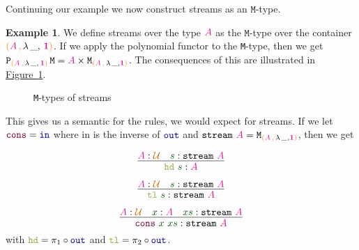 \documentclass[twoside,11pt,openright]{report}
\theoremstyle{plain} %
\theoremstyle{definition}
\newtheorem{exmp}{Example} %
\theoremstyle{remark}
\newcommand*{\figref}[1]{\hyperref[fig:#1]{Figure~\ref*{fig:#1}}}
\newcommand*{\term}[1]{\textcolor{green!30!black}{#1}} %
\newcommand*{\type}[1]{\textcolor{magenta!90!black}{#1}}
\newcommand*{\containerpair}[2]{\ensuremath{\colorlet{savedleftcolor}{.}\color{orange}\left(\color{savedleftcolor}#1\,\textcolor{orange}{\mathbf{,}}\,#2\color{orange}\right)\color{savedleftcolor}}}
\newcommand*{\containerpairsimple}[2]{\containerpair{#1}{\lambda\,\_,\,#2}}
\newcommand*{\universe}[1]{\textcolor{orange!80!black}{#1}}
\newcommand*{\unit}{\type{\textbf{1}}}
\newcommand*{\function}[1]{\textcolor{blue!60!black}{\ensuremath{\mathtt{#1}}}}
\newcommand*{\constructor}[1]{\textcolor{purple!60!black}{\ensuremath{\mathtt{#1}}}}
\newcommand*{\destructor}[1]{\textcolor{yellow!60!black}{\ensuremath{\mathtt{#1}}}}
\newcommand*{\typeformer}[1]{\ensuremath{\mathtt{#1}}}
\newcommand*{\functor}[1]{\ensuremath{\mathbf{\mathtt{#1}}}}
\begin{document}
\noindent Continuing our example we now construct streams as an \(\mathtt{M}\)-type.
\begin{exmp}
  \label{exmp:stream-M-type-example}
  We define streams over the type \(\type{A}\) as the \(\mathtt{M}\)-type over the container \(\containerpairsimple{\type{A}}{\unit}\). If we apply the polynomial functor to the \texttt{M}-type, then we get \(\functor{P}_{\containerpairsimple{\type{A}}{\unit}}\,\typeformer{M} = \type{A} \times \typeformer{M}_{\containerpair{\type{A}}{\lambda\,\_,\unit}}\). The consequences of this are illustrated in \figref{stream-M-type}.
  \begin{figure}[h]
    \centering
    \caption{\texttt{M}-types of streams}
    \label{fig:stream-M-type}
  \end{figure}
  This gives us a semantic for the rules, we would expect for streams. If we let \(\constructor{cons} = \function{in}\) where in is the inverse of \(\function{out}\) and \(\typeformer{stream}~\type{A} = \typeformer{M}_{\containerpair{\type{A}}{\lambda\,\_,\unit}}\), then we get
  \begin{center}
    \strut
    \hfill
    \begin{minipage}{0.4\linewidth}
      \begin{equation}
        \vcenter{\infer{\destructor{hd}~\term{s} : \type{A}}{\type{A} : \universe{\mathcal{U}} & \term{s} : \typeformer{stream}~\type{A}}}
      \end{equation}
    \end{minipage}
    \hfill
    \begin{minipage}{0.4\linewidth}
      \begin{equation}
        \vcenter{\infer{\destructor{tl}~\term{s} : \typeformer{stream}~\type{A}}{\type{A} : \universe{\mathcal{U}} & \term{s} : \typeformer{stream}~\type{A}}}
      \end{equation}
    \end{minipage}
    \hfill
    \strut
  \end{center}
  \begin{equation}
    \vcenter{\infer{\term{\constructor{cons}}~\term{x}~\term{xs} : \typeformer{stream}~\type{A}}{\type{A} : \universe{\mathcal{U}} & \term{x} : \type{A} & \term{xs} : \typeformer{stream}~\type{A}}}
  \end{equation}
  with \(\destructor{hd} = \pi_1 \circ \function{out}\) and \(\destructor{tl} = \pi_2 \circ \function{out}\).
\end{exmp}
\end{document}
